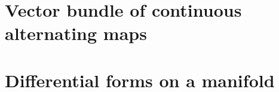 \chapter{Vector bundle of continuous alternating maps}%
\label{cha:vect-bundle-cont}

\chapter{Differential forms on a manifold}%
\label{cha:diff-forms-manif}

